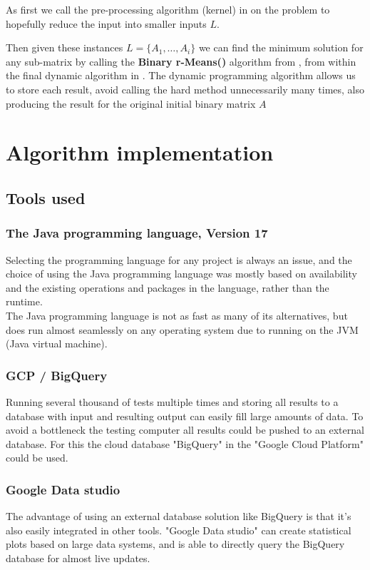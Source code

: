 \documentclass[a4paper]{article}
\begin{document}
As first we call the pre-processing algorithm (kernel) in  
on the problem to hopefully reduce the input into smaller inputs $L$. 

Then given these instances $L = \{A_1, \dots, A_i\}$ we can find the minimum solution for any 
sub-matrix by calling the \textbf{Binary r-Means()} algorithm from , from within the final 
dynamic algorithm in . The dynamic programming algorithm allows us to store each result, avoid calling 
the hard method unnecessarily many times, also producing the result for the original initial binary matrix $A$

%
%
\newpage

\section{Algorithm implementation}
\label{sec:impl}
\subsection{Tools used}
\subsubsection{The Java programming language, Version 17}
Selecting the programming language for any project is always an issue, and the choice of using
the Java programming language was mostly based on availability and the existing operations
and packages in the language, rather than the runtime.
\\
The Java programming language is not as fast as many of its alternatives, but does run almost
seamlessly on any operating system due to running on the JVM (Java virtual machine).

\subsubsection{GCP / BigQuery}
\label{sec:bigquery}
Running several thousand of tests multiple times and storing all results to a database with
input and resulting output can easily fill large amounts of data. To avoid a bottleneck the
testing computer all results could be pushed to an external database. For this the cloud database
"BigQuery" in the "Google Cloud Platform" could be used.

\subsubsection{Google Data studio}
\label{sec:datastudio}
The advantage of using an external database solution like BigQuery is that it's also easily
integrated in other tools. "Google Data studio" can create statistical plots based on large
data systems, and is able to directly query the BigQuery database for almost live updates.
\end{document}
